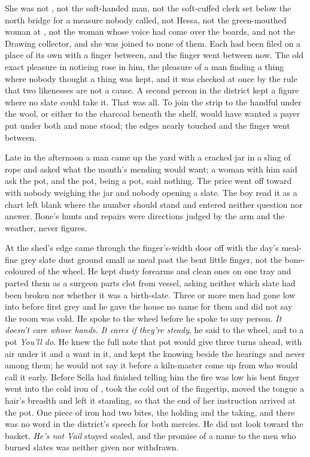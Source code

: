 She was not , not the soft-handed man, not the soft-cuffed clerk set below the north bridge for a measure nobody called, not Hessa, not the green-mouthed woman at , not the woman whose voice had come over the boards, and not the Drawing collector, and she was joined to none of them. Each had been filed on a place of its own with a finger between, and the finger went between now. The old exact pleasure in noticing rose in him, the pleasure of a man finding a thing where nobody thought a thing was kept, and it was checked at once by the rule that two likenesses are not a cause. A second person in the district kept a figure where no slate could take it. That was all. To join the strip to the handful under the wool, or either to the charcoal beneath the shelf, would have wanted a payer put under both and none stood; the edges nearly touched and the finger went between.

Late in the afternoon a man came up the yard with a cracked jar in a sling of rope and asked what the month's mending would want; a woman with him said ask the pot, and the pot, being a pot, said nothing. The price went off toward  with nobody weighing the jar and nobody opening a slate. The boy read it as a chart left blank where the number should stand and entered neither question nor answer. Bone's hunts and repairs were directions judged by the arm and the weather, never figures.

\scenebreak

At the shed's edge  came through the finger's-width door off  with the day's meal-fine grey slate dust ground small as meal past the bent little finger, not the bone-coloured  of the wheel. He kept dusty forearms and clean ones on one tray and parted them as a surgeon parts clot from vessel, asking neither which slate had been broken nor whether it was a birth-slate. Three or more men had gone low into  before first grey and he gave the house no name for them and did not say the room was cold. He spoke to the wheel before he spoke to any person. \emph{It doesn't care whose hands. It cares if they're steady}, he said to the wheel, and to a pot \emph{You'll do}. He knew the full note that pot would give three turns ahead, with air under it and a want in it, and kept the knowing beside the hearings and never among them; he would not say it before a kiln-master come up from  who would call it early. Before Sella had finished telling him the fire was low his bent finger went into the cold iron of , took the cold out of the fingertip, moved the tongue a hair's breadth and left it standing, so that the end of her instruction arrived at the pot. One piece of iron had two bites, the holding and the taking, and there was no word in the district's speech for both mercies. He did not look toward the basket. \emph{He's not Vail} stayed sealed, and the promise of a name to the men who burned slates was neither given nor withdrawn.

